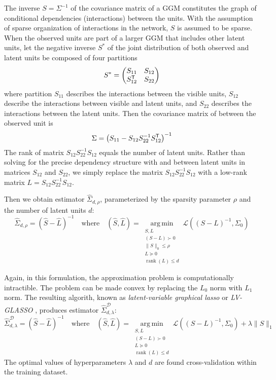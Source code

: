 \documentclass[10pt]{article}
\newcommand{\loss}[1]{\mathcal L\left(#1\right)}
\newcommand{\T}{{\sf T}}
\DeclareMathOperator*{\argmin}{arg\,min}
\DeclareMathOperator{\rank}{rank}
\begin{document}
The inverse $S=\Sigma^{-1}$ of the covariance matrix of a GGM constitutes the graph of conditional dependencies (interactions) between the units.  With the assumption of sparse organization of interactions in the network, $S$ is assumed to be sparse.  When the observed units are part of a larger GGM that includes other latent units, let the negative inverse $S^*$ of the joint distribution of both observed and latent units be composed of four partitions
\begin{equation}
S^* = 
\begin{pmatrix}
S_{11} & S_{12} \\
S_{12}^\T & S_{22} 
\end{pmatrix}
\end{equation}
where partition $S_{11}$ describes the interactions between the visible units, $S_{12}$ describe the interactions between visible and latent units, and $S_{22}$ describes the interactions between the latent units. 
Then the covariance matrix of between the observed unit is 
\begin{equation}
\Sigma = \left(S_{11} - S_{12}S_{22}^{-1}S_{12}^\T\right)^{-1}
\end{equation} 
The rank of matrix $S_{12}S_{22}^{-1}S_{12}$ equals the number of latent units. Rather than solving for the precise dependency structure with and between latent units in matrices $S_{12}$ and $S_{22}$, we simply replace the matrix $ S_{12}S_{22}^{-1}S_{12}$ with a low-rank matrix $L= S_{12}S_{22}^{-1}S_{12}$.

Then we obtain estimator $\hat\Sigma_{d,\rho}$, parameterized by the sparsity parameter $\rho$ and  the number of latent units $d$:
\begin{equation}
\hat\Sigma_{d,\rho} = \left(\hat S-\hat L\right)^{-1}
\quad\mbox{where}\quad
(\hat S, \hat L) = \argmin\limits_{\substack{S,L\\ (S-L)\succ 0 \\ \|S\|_0\le\rho \\ L\succeq 0 \\ \rank(L) \le d}} \loss{(S-L)^{-1},\Sigma_0}
\end{equation}

Again, in this formulation, the approximation problem is computationally intractible.  The problem can be made convex by replacing the $L_0$ norm with $L_1$ norm. The resulting algorith, known as \emph{latent-variable graphical lasso} or \emph{LV-GLASSO} \cite{Chandrasekaran:2010,Ma:2013}, produces estimator $\hat\Sigma_{d,\lambda}^{\mathcal D}$:
\begin{equation}
\hat\Sigma_{d,\lambda} ^{\mathcal D} = \left(\hat S-\hat L\right)^{-1}
\quad\mbox{where}\quad
(\hat S, \hat L) = \argmin\limits_{\substack{ S,L \\ (S-L)\succ 0 \\ L\succeq 0 \\ \rank(L) \le d}} \loss{(S-L)^{-1},\Sigma_0} + \lambda \| S \|_1 
\end{equation}
The optimal values of hyperparameters $\lambda$ and $d$ are found cross-validation within the training dataset.
\end{document}
